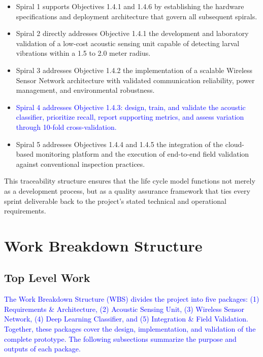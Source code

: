 \documentclass[12pt,a4paper,oneside]{memoir}
\newcommand{\earlierrevision}[1]{\textcolor{blue}{#1}}
\begin{document}
\begin{itemize}
    \item Spiral 1 supports Objectives 1.4.1 and 1.4.6 by establishing the hardware
    specifications and deployment architecture that govern all subsequent spirals.

    \item Spiral 2 directly addresses Objective 1.4.1 the development and laboratory
    validation of a low-cost acoustic sensing unit capable of detecting larval vibrations within
    a 1.5 to 2.0 meter radius.

    \item Spiral 3 addresses Objective 1.4.2 the implementation of a scalable Wireless Sensor
    Network architecture with validated communication reliability, power management, and
    environmental robustness.

    \item \earlierrevision{Spiral 4 addresses Objective 1.4.3: design, train, and validate the acoustic classifier,
    prioritize recall, report supporting metrics, and assess variation through 10-fold
    cross-validation.}

    \item Spiral 5 addresses Objectives 1.4.4 and 1.4.5 the integration of the cloud-based
    monitoring platform and the execution of end-to-end field validation against conventional
    inspection practices.
\end{itemize}

This traceability structure ensures that the life cycle model functions not merely as a development process, but as a quality assurance framework that ties every sprint deliverable back to the project's stated technical and operational requirements.

\section{Work Breakdown Structure}
\label{sec:WBS}

\subsection{Top Level Work}

\earlierrevision{The Work Breakdown Structure (WBS) divides the project into five packages: (1) Requirements \& Architecture, (2) Acoustic Sensing Unit, (3) Wireless Sensor Network, (4) Deep Learning Classifier, and (5) Integration \& Field Validation. Together, these packages cover the design, implementation, and validation of the complete prototype. The following subsections summarize the purpose and outputs of each package.}
\end{document}
